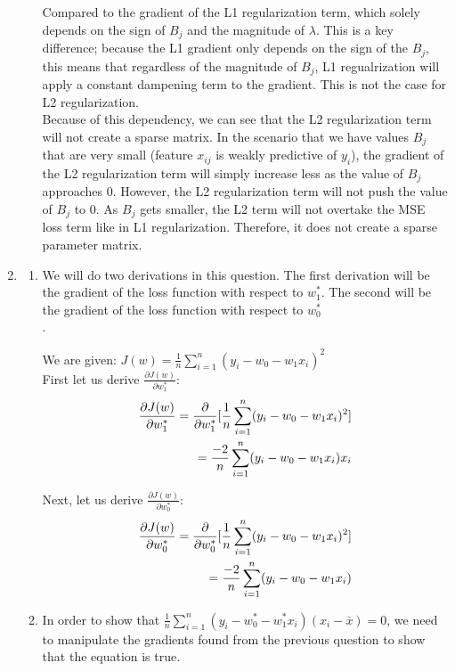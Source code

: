\documentclass[12pt]{article}
\begin{document}
\begin{enumerate}
\begin{enumerate}
Compared to the gradient of the L1 regularization term, which solely depends on the sign of $B_j$ and the magnitude of $\lambda$. This is a key difference; because the L1 gradient only depends on the sign of the $B_j$, this means that regardless of the magnitude of $B_j$, L1 regualrization will apply a constant dampening term to the gradient. This is not the case for L2 regularization. \\ 

Because of this dependency, we can see that the L2 regularization term will not create a sparse matrix. In the scenario that we have 
values $B_j$ that are very small (feature $x_{ij}$ is weakly predictive of $y_i$), the gradient of the L2 regularization term will simply increase less as the value of $B_j$ approaches 0. However, 
the L2 regularization term will not push the value of $B_j$ to 0. As $B_j$ gets smaller, the L2 term will not overtake the MSE loss term like in L1 regularization. Therefore, it does not create a sparse parameter matrix.  
\end{enumerate}

\item
  \begin{enumerate}
  \item We will do two derivations in this question. The first derivation will be the gradient of the loss function with respect to $w^{*}_1$. The second will be the gradient of the loss function 
with respect to $w^{*}_0$ \\. 

    We are given: $J(w) = \frac{1}{n} \sum_{i=1}^{n} (y_i - w_0 - w_1x_i)^2$ \\ 

    First let us derive $\frac{\partial J(w)}{\partial w^{*}_1}$: \\ 
    \begin{align}
      \frac{\partial J(w)}{\partial w^{*}_1} = \frac{\partial}{\partial w^{*}_1} [\frac{1}{n} \sum_{i=1}^{n} (y_i - w_0 - w_1x_i)^2] \notag \\ 
      = \frac{-2}{n} \sum_{i=1}^{n} (y_i - w_0 - w_1x_i)x_i \notag 
    \end{align}

    Next, let us derive $\frac{\partial J(w)}{\partial w^{*}_0}$: \\ 
    \begin{align}
      \frac{\partial J(w)}{\partial w^{*}_0} = \frac{\partial}{\partial w^{*}_0} [\frac{1}{n} \sum_{i=1}^{n} (y_i - w_0 - w_1x_i)^2] \notag \\ 
      = \frac{-2}{n} \sum_{i=1}^{n} (y_i - w_0 - w_1x_i) \notag 
    \end{align}
  \item In order to show that $\frac{1}{n} \sum_{i=1}^{n} (y_i - w^*_0 - w_{1}^{*}x_i)(x_i-\bar{x}) = 0$, 
we need to manipulate the gradients found from the previous question to show that the equation is true. \\


\end{enumerate}
\end{enumerate}
\end{document}

